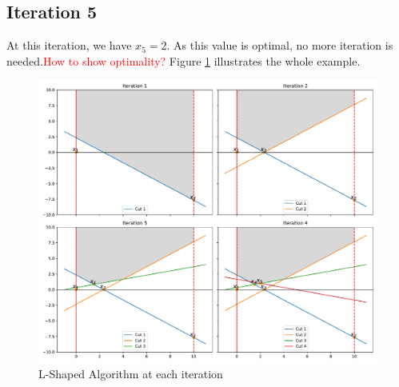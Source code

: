 \documentclass[12pt, openany]{report}
\theoremstyle{definition}
\begin{document}
\subsection{Iteration 5}
At this iteration, we have $x_5=2$. As this value is optimal, no more iteration is needed.\textcolor{red}{How to show optimality?} Figure \ref{fig:l-shaped} illustrates the whole example. 
\begin{figure}
	\centering 
	\includegraphics[width= .9\textwidth]{img/l_shaped_algo.pdf}
	\caption{L-Shaped Algorithm at each iteration}
	\label{fig:l-shaped}
\end{figure}
\end{document}
